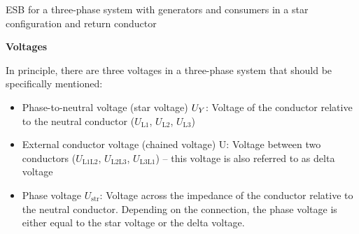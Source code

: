 \begin{frame}
    \renewcommand{\figurename}{Figure}
    
    
    \b{
        ESB for a three-phase system with generators and consumers in a star configuration and return conductor
    }
\end{frame}

\begin{frame}
    
    
    \textbf{Voltages}
    
    In principle, there are three voltages in a three-phase system that should be specifically mentioned:

    \begin{itemize}
        \item Phase-to-neutral voltage (star voltage) $U_Y$: Voltage of the conductor relative to the neutral conductor ($U_{\mathrm{L1}}$, $U_{\mathrm{L2}}$, $U_{\mathrm{L3}}$)
        \item External conductor voltage (chained voltage) U: Voltage between two conductors ($U_{\mathrm{L1L2}}$, $U_{\mathrm{L2L3}}$, $U_{\mathrm{L3L1}}$) -- this voltage is also referred to as delta voltage
        \item Phase voltage $U_{\mathrm{str}}$: Voltage across the impedance of the conductor relative to the neutral conductor. Depending on the connection, the phase voltage is either equal to the star voltage or the delta voltage.
    \end{itemize}
    
\end{frame}


